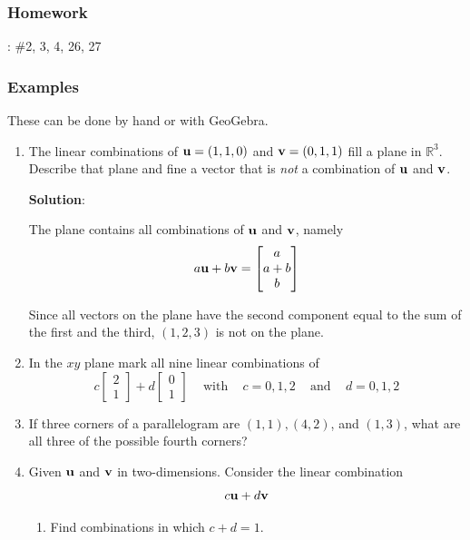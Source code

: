 \subsubsection*{Homework}
: \#2, 3, 4, 26, 27



\subsubsection*{Examples}

These can be done by hand or with GeoGebra.  

\begin{enumerate}

	\item The linear combinations of ${\bf u} = (1,1,0)$ and ${\bf v} = (0 ,1,1)$ fill a plane in $\mathbb{R}^3$.  Describe that plane and fine a vector that is \textit{not} a combination of ${\bf u}$ and ${\bf v}$.  
	
	\textbf{Solution}: {\color{blue} The plane contains all combinations of ${\bf u}$ and ${\bf v}$, namely
	\[  a{\bf u}  +  b {\bf v} = \begin{bmatrix}  a \\ a+b \\ b \end{bmatrix} \]
	
	Since all vectors on the plane have the second component equal to the sum of the first and the third, $(1,2,3)$ is not on the plane.}
	
	  
	\item In the $xy$ plane mark all nine linear combinations of 
	\[ c \begin{bmatrix} 2\\1\end{bmatrix} + d  \begin{bmatrix} 0\\1\end{bmatrix} \;\;\; \text{ with } \;\;\; c=0, 1, 2 \;\;\; \text{ and } \;\;\; d=0, 1, 2 \]
	
	\item If three corners of a parallelogram are $(1,1), (4, 2)$, and $(1,3)$, what are all three of the possible fourth corners?  
	
	
	\item Given ${\bf u}$ and ${\bf v}$ in two-dimensions.  Consider the linear combination 
	\[ c{\bf u} + d {\bf v}   \]  
	
		\begin{enumerate}
			\item Find combinations in which $c+d = 1$.  
			

\end{enumerate}
\end{enumerate}

